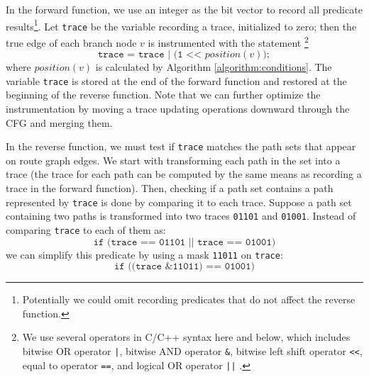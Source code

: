 In the forward function, we use an integer as the bit vector to record all predicate results\footnote{Potentially we could omit recording predicates that do not affect the reverse function.}. 
Let \texttt{trace} be the variable recording a trace, initialized to zero; then the true edge of each branch node $v$ is instrumented with the statement \footnote{We use several operators in C/C++ syntax here and below, which includes bitwise OR operator \texttt{|}, bitwise AND operator \texttt{\&}, bitwise left shift operator  \texttt{<<}, equal to operator \texttt{==}, and logical OR operator \texttt{||} .}
$$ \texttt{trace = trace  | (1 << $\mathit{position(v)}$)}; $$ 
where $\mathit{position(v)}$ is calculated by Algorithm \ref{algorithm:conditions}. 
The variable \texttt{trace} is stored at the end of the forward function and restored at the beginning of the reverse function. 
Note that we can further optimize the instrumentation by moving a trace updating operations downward through the CFG and merging them.



In the reverse function, we must test if \texttt{trace} matches the path sets that appear on route graph edges. We start with transforming each path in the set into a trace (the trace for each path can be computed by the same means as recording a trace in the forward function).
Then, checking if a path set contains a path represented by \texttt{trace} is done by comparing it to each trace. 
Suppose a path set containing two paths is transformed into two traces \texttt{01101} and \texttt{01001}. Instead of comparing \texttt{trace} to each of them as:
$$ \texttt{if (trace == 01101 || trace == 01001)} $$ 
we can simplify this predicate by using a mask \texttt{11011} on \texttt{trace}:
$$ \texttt{if ((trace \& 11011) == 01001)} $$ 

